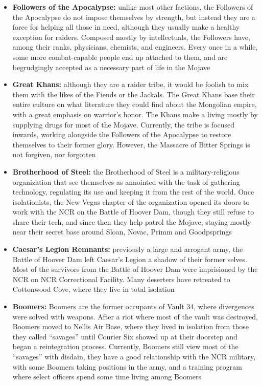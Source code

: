 \documentclass[11pt]{article} %
\begin{document}
\begin{itemize}
\item \textbf{Followers of the Apocalypse:} unlike most other factions, the Followers of the Apocalypse do not impose themselves by strength, but instead they are a force for helping all those in need, although they usually make a healthy exception for raiders. Composed mostly by intellectuals, the Followers have, among their ranks, physicians, chemists, and engineers. Every once in a while, some more combat-capable people end up attached to them, and are begrudgingly accepted as a necessary part of life in the Mojave

\item \textbf{Great Khans:} although they are a raider tribe, it would be foolish to mix them with the likes of the Fiends or the Jackals. The Great Khans base their entire culture on what literature they could find about the Mongolian empire, with a great emphasis on warrior's honor. The Khans make a living mostly by supplying drugs for most of the Mojave. Currently, the tribe is focused inwards, working alongside the Followers of the Apocalypse to restore themselves to their former glory. However, the Massacre of Bitter Springs is not forgiven, nor forgotten

\item \textbf{Brotherhood of Steel:} the Brotherhood of Steel is a military-religious organization that see themselves as annointed with the task of gathering technology, regulating its use and keeping it from the rest of the world. Once isolationists, the New Vegas chapter of the organization opened its doors to work with the NCR on the Battle of Hoover Dam, though they still refuse to share their tech, and since then they help patrol the Mojave, staying mostly near their secret base around Sloan, Novac, Primm and Goodpsprings 

\item \textbf{Caesar's Legion Remnants:} previously a large and arrogant army, the Battle of Hoover Dam left Caesar's Legion a shadow of their former selves. Most of the survivors from the Battle of Hoover Dam were imprisioned by the NCR on NCR Correctional Facility. Many deserters have retreated to Cottonwood Cove, where they live in total isolation

\item \textbf{Boomers:} Boomers are the former occupants of Vault 34, where divergences were solved with weapons. After a riot where most of the vault was destroyed, Boomers moved to Nellis Air Base, where they lived in isolation from those they called ``savages'' until Courier Six showed up at their doorstep and began a reintegration process. Currently, Boomers still view most of the ``savages'' with disdain, they have a good relationship with the NCR military, with some Boomers taking positions in the army, and a training program where select officers spend some time living among Boomers


\end{itemize}
\end{document}
